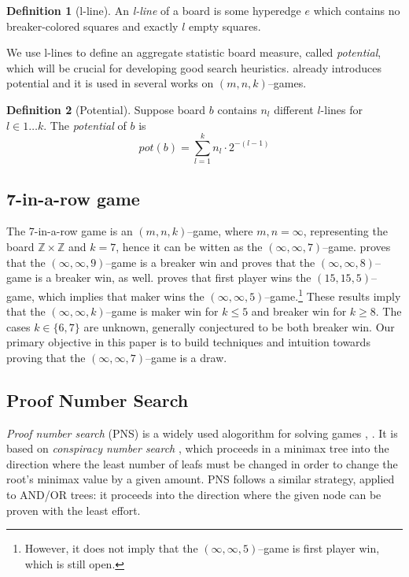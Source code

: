 \documentclass[conference]{IEEEtran}
\theoremstyle{definition}
\newtheorem{definition}{Definition}[section]
\begin{document}
\begin{definition}[l-line]
An \emph{l-line} of a board is some hyperedge $e$ which contains no breaker-colored squares and exactly $l$ empty squares.
\end{definition}

We use l-lines to define an aggregate statistic board measure, called \emph{potential}, which will be crucial for developing good search heuristics. \cite{BECK1981117} already introduces potential and it is used in several works on $(m,n,k)$--games.

\begin{definition}[Potential]
Suppose board $b$ contains $n_l$ different $l$-lines for $l \in 1 \dots k$. The \emph{potential} of $b$ is
$$pot(b) = \sum_{l=1}^k n_l \cdot 2^{-(l-1)}$$
\end{definition}


\subsection{7-in-a-row game}
The 7-in-a-row game is an $(m,n,k)$--game, where $m,n=\infty$, representing the board $\mathbb{Z} \times \mathbb{Z}$ and $k=7$, hence it can be witten as the $(\infty,\infty,7)$--game. \cite{BerlekampElwynR1983Wwfy} proves that the $(\infty,\infty,9)$--game is a breaker win and \cite{inf_inf_8} proves that the $(\infty,\infty,8)$--game is a breaker win, as well. \cite{Allis1994SearchingFS} proves that first player wins the $(15,15,5)$--game, which implies that maker wins the $(\infty,\infty,5)$--game.\footnote{However, it does not imply that the $(\infty,\infty,5)$--game is first player win, which is still open.} These results imply that the $(\infty,\infty,k)$--game is maker win for $k \leq 5$ and breaker win for $k \geq 8$. The cases $k \in \{6,7\}$ are unknown, generally conjectured to be both breaker win.
Our primary objective in this paper is to build techniques and intuition towards proving that the $(\infty,\infty,7)$--game is a draw.


\subsection{Proof Number Search}
\emph{Proof number search} (PNS) is a widely used alogorithm for solving games \cite{PNS_base}, \cite{hex_8x8}. It is based on \emph{conspiracy number search} \cite{conspiracy}, which proceeds in a minimax tree into the direction where the least number of leafs must be changed in order to change the root's minimax value by a given amount. PNS follows a similar strategy, applied to AND/OR trees: it proceeds into the direction where the given node can be proven with the least effort.
\end{document}
